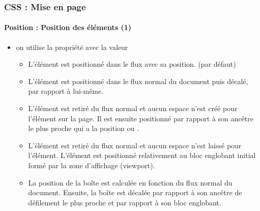 \documentclass[xcolor=table]{beamer}
\begin{document}
\begin{frame}[fragile]
\frametitle{CSS : Mise en page}
\framesubtitle{Position : Position des éléments (1)}

\begin{itemize}
	\item on utilise la propriété  avec la valeur
	\begin{itemize}
		\item {} L'élément est positionné dans le flux avec sa position. (par défaut)
		
		\item {} L'élément est positionné dans le flux normal du document puis décalé, par rapport à lui-même.
		
		\item {} L'élément est retiré du flux normal et aucun espace n'est créé pour l'élément sur la page. Il est ensuite positionné par rapport à son ancêtre le plus proche qui a la position  ou .
		
		\item {} L'élément est retiré du flux normal et aucun espace n'est laissé pour l'élément. L'élément est positionné relativement au bloc englobant initial formé par la zone d'affichage (viewport).
		
		\item {} La position de la boîte est calculée en fonction du flux normal du document. Ensuite, la boîte est décalée par rapport à son ancêtre de défilement le plus proche et par rapport à son bloc englobant. 
	\end{itemize}
\end{itemize}

\end{frame}
\end{document}

